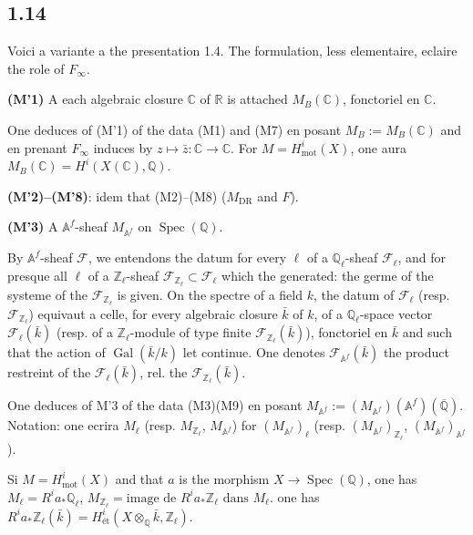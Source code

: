 \documentclass[12pt,a4paper]{article}
\theoremstyle{plain}
\theoremstyle{definition}
\theoremstyle{remark}
\DeclareMathOperator{\Spec}{Spec}
\DeclareMathOperator{\Gal}{Gal}
\newcommand{\mot}{\mathrm{mot}}
\providecommand{\Gal}{\operatorname{Gal}}
\providecommand{\Spec}{\operatorname{Spec}}
\providecommand{\mot}{\mathrm{mot}}
\providecommand{\DR}{\mathrm{DR}}
\begin{document}
\subsection*{1.14}

Voici a variante a the presentation 1.4. The formulation, less elementaire,
eclaire the role of $F_\infty$.

\textbf{(M'1)} A each algebraic closure $\mathbb{C}$ of $\mathbb{R}$ is attached
$M_B(\mathbb{C})$, fonctoriel en $\mathbb{C}$.

One deduces of (M'1) of the data (M1) and (M7) en posant $M_B := M_B(\mathbb{C})$ and en
prenant $F_\infty$ induces by $z \mapsto \bar{z}: \mathbb{C} \to \mathbb{C}$. For
$M = H^i_\mot(X)$, one aura $M_B(\mathbb{C}) = H^i(X(\mathbb{C}), \mathbb{Q})$.

\textbf{(M'2)--(M'8)}: idem that (M2)--(M8) ($M_{\DR}$ and $F$).

\textbf{(M'3)} A $\mathbb{A}^f$-sheaf $M_{\mathbb{A}^f}$ on $\Spec(\mathbb{Q})$.

By $\mathbb{A}^f$-sheaf $\mathcal{F}$, we entendons the datum for every $\ell$ of a
$\mathbb{Q}_\ell$-sheaf $\mathcal{F}_\ell$, and for presque all $\ell$ of a
$\mathbb{Z}_\ell$-sheaf $\mathcal{F}_{\mathbb{Z}_\ell} \subset \mathcal{F}_\ell$ which
the generated: the germe of the systeme of the $\mathcal{F}_{\mathbb{Z}_\ell}$ is given. On the
spectre of a field $k$, the datum of $\mathcal{F}_\ell$ (resp.
$\mathcal{F}_{\mathbb{Z}_\ell}$) equivaut a celle, for every algebraic closure
$\bar{k}$ of $k$, of a $\mathbb{Q}_\ell$-space vector
$\mathcal{F}_\ell(\bar{k})$ (resp. of a $\mathbb{Z}_\ell$-module of type finite
$\mathcal{F}_{\mathbb{Z}_\ell}(\bar{k})$), fonctoriel en $\bar{k}$ and such that the action of
$\Gal(\bar{k}/k)$ let continue. One denotes $\mathcal{F}_{\mathbb{A}^f}(\bar{k})$ the product
restreint of the $\mathcal{F}_\ell(\bar{k})$, rel. the $\mathcal{F}_{\mathbb{Z}_\ell}(\bar{k})$.

One deduces of M'3 of the data (M3)(M9) en posant $M_{\mathbb{A}^f} :=
(M_{\mathbb{A}^f})(\mathbb{A}^f)(\overline{\mathbb{Q}})$. Notation: one ecrira
$M_\ell$ (resp. $M_{\mathbb{Z}_\ell}$, $M_{\mathbb{A}^f}$) for
$(M_{\mathbb{A}^f})_\ell$ (resp. $(M_{\mathbb{A}^f})_{\mathbb{Z}_\ell}$,
$(M_{\mathbb{A}^f})_{\mathbb{A}^f}$).

Si $M = H^i_\mot(X)$ and that $a$ is the morphism $X \to \Spec(\mathbb{Q})$, one has
$M_\ell = R^i a_* \mathbb{Q}_\ell$, $M_{\mathbb{Z}_\ell} = \text{image de } R^i a_*
\mathbb{Z}_\ell \text{ dans } M_\ell$. one has $R^i a_* \mathbb{Z}_\ell(\bar{k}) =
H^i_\text{\'et}(X \otimes_{\mathbb{Q}} \bar{k}, \mathbb{Z}_\ell)$.
\end{document}
